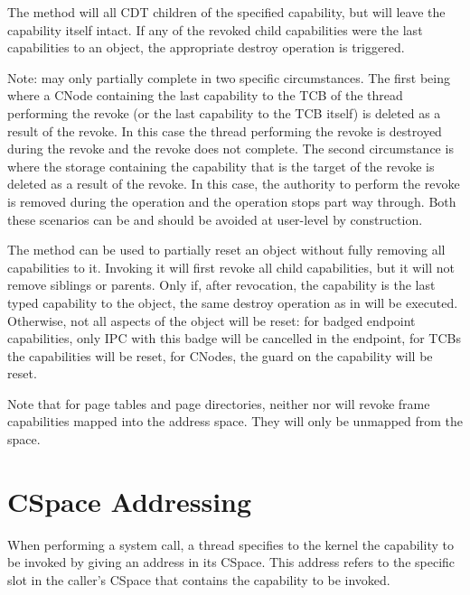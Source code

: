 The  method will
 all CDT children of the
specified capability, but will leave the capability itself intact. If
any of the revoked child capabilities were the last capabilities to an
object, the appropriate destroy operation is triggered.

Note:  may only partially
complete in two specific circumstances. The first being where a
CNode containing the last capability to the TCB of the thread
performing the revoke (or the last capability to the TCB itself) is
deleted as a result of the revoke. In this case the thread performing
the revoke is destroyed during the revoke and the revoke does not
complete. The second circumstance is where the storage containing the
capability that is the target of the revoke is deleted as a result of
the revoke. In this case, the authority to perform the revoke is
removed during the operation and the operation stops part way
through. Both these scenarios can be and should be avoided at
user-level by construction.

The  method can be used
to partially reset an object without fully removing all capabilities
to it. Invoking it will first revoke all child capabilities, but it
will not remove siblings or parents. Only if, after revocation, the
capability is the last typed capability to the object, the same
destroy operation as in 
will be executed. Otherwise, not all aspects of the object will be
reset: for badged endpoint capabilities, only IPC with this badge will
be cancelled in the endpoint, for TCBs the capabilities will be reset,
for CNodes, the guard on the capability will be reset.

Note that for page tables and page directories, neither
 nor
 will revoke frame
capabilities mapped into the address space.  They will only be
unmapped from the space.


\section{CSpace Addressing}
\label{s:cspace-addressing}

When performing a system call, a thread specifies to the kernel the
capability to be invoked by giving an address in its CSpace. This
address refers to the specific slot in the caller's CSpace that
contains the capability to be invoked.

